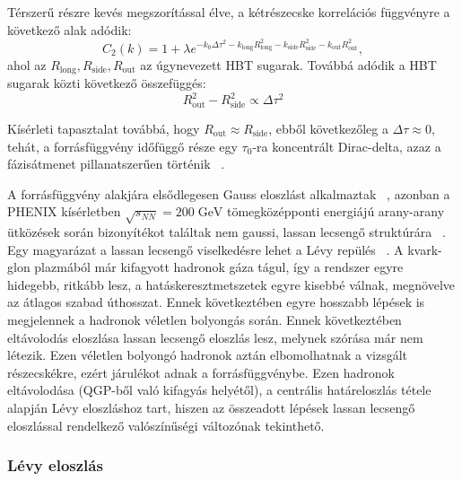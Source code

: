 \documentclass[10pt,a4paper]{article}
\numberwithin{equation}{subsection}
\numberwithin{figure}{section}
\begin{document}
Térszerű részre kevés megszorítással élve, a kétrészecske korrelációs függvényre a következő alak adódik:
\begin{equation}
C_2(k)=1+\lambda e^{-k_0\Delta\tau^2-k_{\mathrm{long}}R_{\mathrm{long}}^2-k_{\mathrm{side}}R_{\mathrm{side}}^2-k_{\mathrm{out}}R_{\mathrm{out}}^2},
\end{equation}
ahol az $R_{\mathrm{long}},R_{\mathrm{side}},R_{\mathrm{out}}$ az úgynevezett HBT sugarak. Továbbá adódik a HBT sugarak közti következő összefüggés:
\begin{equation}
R_{\mathrm{out}}^2-R_{\mathrm{side}}^2\propto \Delta\tau^2
\end{equation}

Kísérleti tapasztalat továbbá, hogy $R_{\mathrm{out}}\approx R_{\mathrm{side}}$, ebből következőleg a $\Delta\tau\approx 0$, tehát, a  forrásfüggvény időfüggő része egy $\tau_0$-ra koncentrált Dirac-delta, azaz a fázisátmenet pillanatszerűen történik ~\cite{Ster:2010ia}.



A forrásfüggvény alakjára elsődlegesen Gauss eloszlást alkalmaztak ~\cite{Csorgo:2005gd, Lisa:2005dd}, azonban a PHENIX kísérletben $\sqrt{s_{NN}}=200\;\mathrm{GeV}$ tömegközépponti energiájú arany-arany ütközések során bizonyítékot találtak nem gaussi, lassan lecsengő struktúrára ~\cite{Adler:2006as}. Egy magyarázat a lassan lecsengő viselkedésre lehet a Lévy repülés ~\cite{Csanad:2007fr}. A kvark-glon plazmából már kifagyott hadronok gáza tágul, így a rendszer egyre hidegebb, ritkább lesz, a hatáskeresztmetszetek egyre kisebbé válnak, megnövelve az átlagos szabad úthosszat. Ennek következtében egyre hosszabb lépések is megjelennek a hadronok véletlen bolyongás során. Ennek következtében eltávolodás eloszlása lassan lecsengő eloszlás lesz, melynek szórása már nem létezik. Ezen véletlen bolyongó hadronok aztán elbomolhatnak a vizsgált részecskékre, ezért járulékot adnak a forrásfüggvénybe. Ezen hadronok eltávolodása (QGP-ből való kifagyás helyétől), a centrális határeloszlás tétele alapján Lévy eloszláshoz tart, hiszen az összeadott lépések lassan lecsengő eloszlással rendelkező valószínűségi változónak tekinthető.

\subsubsection{Lévy eloszlás}
\end{document}
